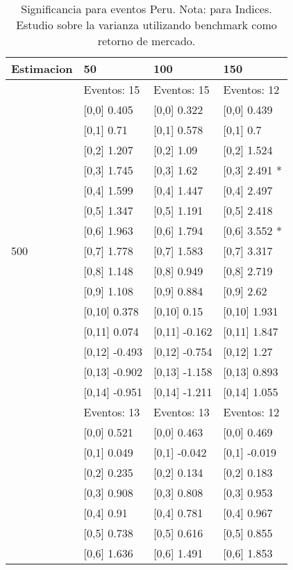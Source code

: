 \begin{table}

\caption{Significancia para eventos Peru. Nota: para Indices. Estudio sobre la varianza utilizando benchmark como retorno de mercado.}
\centering
\begin{tabular}[t]{llll}
\toprule
Estimacion & 50 & 100 & 150\\
\midrule
 & Eventos:  15 & Eventos:  15 & Eventos:  12\\
 & {}[0,0] 0.405 & {}[0,0] 0.322 & {}[0,0] 0.439\\
 & {}[0,1] 0.71 & {}[0,1] 0.578 & {}[0,1] 0.7\\
 & {}[0,2] 1.207 & {}[0,2] 1.09 & {}[0,2] 1.524\\
 & {}[0,3] 1.745 & {}[0,3] 1.62 & {}[0,3] 2.491 *\\
\addlinespace
 & {}[0,4] 1.599 & {}[0,4] 1.447 & {}[0,4] 2.497\\
 & {}[0,5] 1.347 & {}[0,5] 1.191 & {}[0,5] 2.418\\
 & {}[0,6] 1.963 & {}[0,6] 1.794 & {}[0,6] 3.552 *\\
500 & {}[0,7] 1.778 & {}[0,7] 1.583 & {}[0,7] 3.317\\
 & {}[0,8] 1.148 & {}[0,8] 0.949 & {}[0,8] 2.719\\
\addlinespace
 & {}[0,9] 1.108 & {}[0,9] 0.884 & {}[0,9] 2.62\\
 & {}[0,10] 0.378 & {}[0,10] 0.15 & {}[0,10] 1.931\\
 & {}[0,11] 0.074 & {}[0,11] -0.162 & {}[0,11] 1.847\\
 & {}[0,12] -0.493 & {}[0,12] -0.754 & {}[0,12] 1.27\\
 & {}[0,13] -0.902 & {}[0,13] -1.158 & {}[0,13] 0.893\\
\addlinespace
 & {}[0,14] -0.951 & {}[0,14] -1.211 & {}[0,14] 1.055\\
 & Eventos:  13 & Eventos:  13 & Eventos:  12\\
 & {}[0,0] 0.521 & {}[0,0] 0.463 & {}[0,0] 0.469\\
 & {}[0,1] 0.049 & {}[0,1] -0.042 & {}[0,1] -0.019\\
 & {}[0,2] 0.235 & {}[0,2] 0.134 & {}[0,2] 0.183\\
\addlinespace
 & {}[0,3] 0.908 & {}[0,3] 0.808 & {}[0,3] 0.953\\
 & {}[0,4] 0.91 & {}[0,4] 0.781 & {}[0,4] 0.967\\
 & {}[0,5] 0.738 & {}[0,5] 0.616 & {}[0,5] 0.855\\
 & {}[0,6] 1.636 & {}[0,6] 1.491 & {}[0,6] 1.853\\

\end{tabular}
\end{table}
